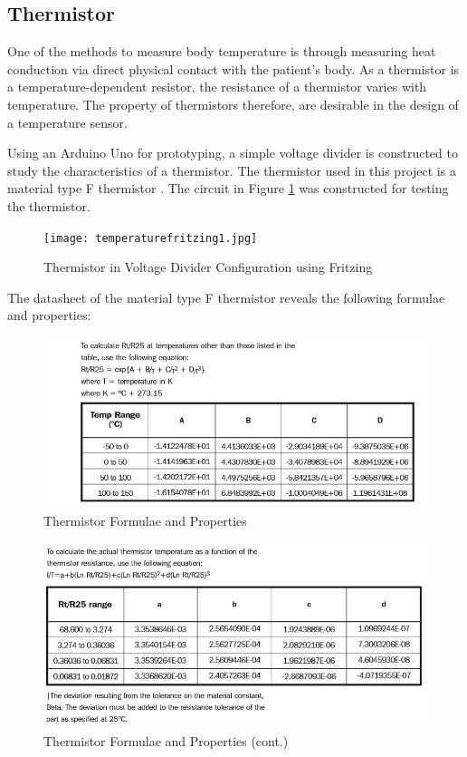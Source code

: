 \subsection{Thermistor}
\label{thermistor}

One of the methods to measure body temperature is through measuring heat conduction via direct physical contact with the patient's body. As a thermistor is a temperature-dependent resistor, the resistance of a thermistor varies with temperature. The property of thermistors therefore, are desirable in the design of a temperature sensor. 

Using an Arduino Uno for prototyping, a simple voltage divider is constructed to study the characteristics of a thermistor. The thermistor used in this project is a material type F thermistor \cite{thermistor}. The circuit in Figure \ref{temperaturefritzing1} was constructed for testing the thermistor. 

\begin{figure}[H]
	\centering
	\texttt{[image: temperaturefritzing1.jpg]}
	\caption{Thermistor in Voltage Divider Configuration using Fritzing}
	\label{temperaturefritzing1}
\end{figure}

The datasheet of the material type F thermistor \cite{thermistor} reveals the following formulae and properties: 

\begin{figure}[H]
	\centering
	\includegraphics[width=0.8\linewidth]{thermistordatasheet2.jpg}
	\caption{Thermistor Formulae and Properties \cite{thermistor}}
	\label{thermistordatasheet2}
\end{figure}

\begin{figure}[H]
	\centering
	\includegraphics[width=0.8\linewidth]{thermistordatasheet3.jpg}
	\caption{Thermistor Formulae and Properties (cont.) \cite{thermistor}}
	\label{thermistordatasheet3}
\end{figure}

